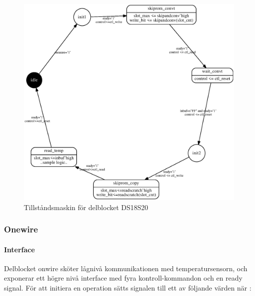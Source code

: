 \begin{figure}[h!]
	\centering
	\includegraphics[width=\textwidth]{ds18s20_fsm.eps}
	\caption{Tillståndsmaskin för delblocket DS18S20}
	\label{fig:ds18s20_fsm}
\end{figure}



\subsubsection{Onewire}\label{sec:onewire}
\paragraph{Interface}
Delblocket onwire sköter lågnivå kommunikationen med temperatursensorn, och exponerar ett högre nivå interface med fyra kontroll-kommandon och en ready signal. För att initiera en operation sätts  signalen till ett av följande värden när :

